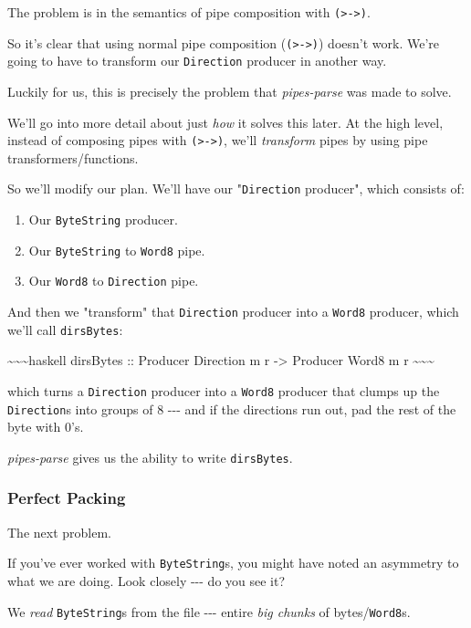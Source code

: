 \documentclass[]{article}
\begin{document}
The problem is in the semantics of pipe composition with
\texttt{(\textgreater{}-\textgreater{})}.

So it's clear that using normal pipe composition
(\texttt{(\textgreater{}-\textgreater{})}) doesn't work. We're going to have to
transform our \texttt{Direction} producer in another way.

Luckily for us, this is precisely the problem that \emph{pipes-parse} was made
to solve.

We'll go into more detail about just \emph{how} it solves this later. At the
high level, instead of composing pipes with
\texttt{(\textgreater{}-\textgreater{})}, we'll \emph{transform} pipes by using
pipe transformers/functions.

So we'll modify our plan. We'll have our "\texttt{Direction} producer", which
consists of:

\begin{enumerate}
\tightlist
\item
  Our \texttt{ByteString} producer.
\item
  Our \texttt{ByteString} to \texttt{Word8} pipe.
\item
  Our \texttt{Word8} to \texttt{Direction} pipe.
\end{enumerate}

And then we "transform" that \texttt{Direction} producer into a \texttt{Word8}
producer, which we'll call \texttt{dirsBytes}:

\textasciitilde{}\textasciitilde{}\textasciitilde{}haskell dirsBytes :: Producer
Direction m r -\textgreater{} Producer Word8 m r
\textasciitilde{}\textasciitilde{}\textasciitilde{}

which turns a \texttt{Direction} producer into a \texttt{Word8} producer that
clumps up the \texttt{Direction}s into groups of 8 -\/-\/- and if the directions
run out, pad the rest of the byte with 0's.

\emph{pipes-parse} gives us the ability to write \texttt{dirsBytes}.

\subsubsection{Perfect Packing}

The next problem.

If you've ever worked with \texttt{ByteString}s, you might have noted an
asymmetry to what we are doing. Look closely -\/-\/- do you see it?

We \emph{read} \texttt{ByteString}s from the file -\/-\/- entire \emph{big
chunks} of bytes/\texttt{Word8}s.
\end{document}
